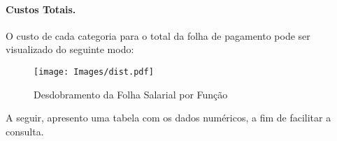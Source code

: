 \documentclass[a4paper, 12pt]{CSSullivanBusinessReport}
\begin{document}
\begin{fullwidth}
\newpage

\paragraph{Custos Totais.} O custo de cada categoria para o total da folha de pagamento pode ser visualizado do seguinte modo:


\begin{figure*}[H]
	\texttt{[image: Images/dist.pdf]}
	\caption{Desdobramento da Folha Salarial por Função}
	\label{fig:salariopfuncao} %
 \end{figure*}


\vspace{-0.7cm}
A seguir, apresento uma tabela com os dados numéricos, a fim de facilitar a consulta.


\end{fullwidth}
\end{document}
